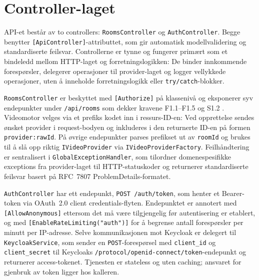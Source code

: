 \section{Controller-laget}
\label{sec:controllers}

API-et består av to controllers: \texttt{RoomsController} og \texttt{AuthController}. Begge benytter \texttt{[ApiController]}-attributtet, som gir automatisk modellvalidering og standardiserte feilsvar. Controllerne er tynne og fungerer primært som et bindeledd mellom HTTP-laget og forretningslogikken: De binder innkommende forespørsler, delegerer operasjoner til provider-laget og logger vellykkede operasjoner, uten å inneholde forretningslogikk eller \texttt{try/catch}-blokker.

\texttt{RoomsController} er beskyttet med \texttt{[Authorize]} på
klassenivå og eksponerer syv endepunkter under \texttt{/api/rooms} som
dekker kravene F1.1--F1.5 og S1.2 \cite{hdo_kravspec}. Videomotor velges via et prefiks kodet inn i ressurs-ID-en: Ved opprettelse sendes ønsket provider i request-bodyen og inkluderes i den returnerte ID-en på formen \texttt{provider:rawId}. På øvrige endepunkter parses
prefikset ut av \texttt{roomId} og brukes til å slå opp riktig
\texttt{IVideoProvider} via \texttt{IVideoProviderFactory}.
Feilhåndtering er sentralisert i \texttt{GlobalExceptionHandler}, som tilordner domenespesifikke exceptions fra provider-laget til HTTP-statuskoder og returnerer standardiserte feilsvar basert på RFC~7807 ProblemDetails-formatet.

\texttt{AuthController} har ett endepunkt, \texttt{POST /auth/token},
som henter et Bearer-token via OAuth~2.0 client credentials-flyten.
Endepunktet er annotert med \texttt{[AllowAnonymous]} ettersom det må være tilgjengelig før autentisering er etablert, og med \texttt{[EnableRateLimiting("auth")]} for å begrense antall forespørsler per minutt per IP-adresse. Selve kommunikasjonen mot Keycloak er delegert til \texttt{KeycloakService}, som sender en \texttt{POST}-forespørsel med \texttt{client\_id} og \texttt{client\_secret} til Keycloaks \texttt{/protocol/openid-connect/token}-endepunkt og returnerer access-tokenet. Tjenesten er stateless og uten caching; ansvaret for gjenbruk av token ligger hos kalleren.